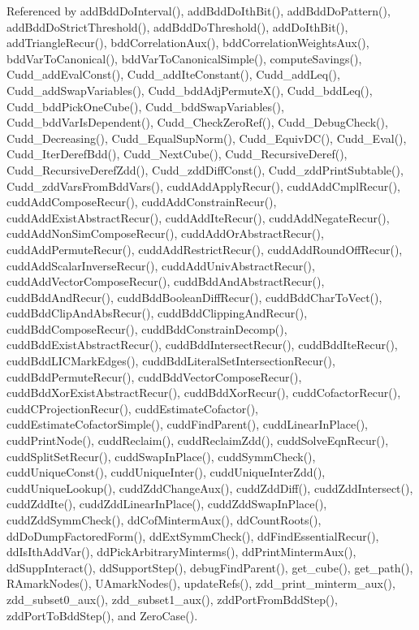 Referenced by add\-Bdd\-Do\-Interval(), add\-Bdd\-Do\-Ith\-Bit(), add\-Bdd\-Do\-Pattern(), add\-Bdd\-Do\-Strict\-Threshold(), add\-Bdd\-Do\-Threshold(), add\-Do\-Ith\-Bit(), add\-Triangle\-Recur(), bdd\-Correlation\-Aux(), bdd\-Correlation\-Weights\-Aux(), bdd\-Var\-To\-Canonical(), bdd\-Var\-To\-Canonical\-Simple(), compute\-Savings(), Cudd\_\-add\-Eval\-Const(), Cudd\_\-add\-Ite\-Constant(), Cudd\_\-add\-Leq(), Cudd\_\-add\-Swap\-Variables(), Cudd\_\-bdd\-Adj\-Permute\-X(), Cudd\_\-bdd\-Leq(), Cudd\_\-bdd\-Pick\-One\-Cube(), Cudd\_\-bdd\-Swap\-Variables(), Cudd\_\-bdd\-Var\-Is\-Dependent(), Cudd\_\-Check\-Zero\-Ref(), Cudd\_\-Debug\-Check(), Cudd\_\-Decreasing(), Cudd\_\-Equal\-Sup\-Norm(), Cudd\_\-Equiv\-DC(), Cudd\_\-Eval(), Cudd\_\-Iter\-Deref\-Bdd(), Cudd\_\-Next\-Cube(), Cudd\_\-Recursive\-Deref(), Cudd\_\-Recursive\-Deref\-Zdd(), Cudd\_\-zdd\-Diff\-Const(), Cudd\_\-zdd\-Print\-Subtable(), Cudd\_\-zdd\-Vars\-From\-Bdd\-Vars(), cudd\-Add\-Apply\-Recur(), cudd\-Add\-Cmpl\-Recur(), cudd\-Add\-Compose\-Recur(), cudd\-Add\-Constrain\-Recur(), cudd\-Add\-Exist\-Abstract\-Recur(), cudd\-Add\-Ite\-Recur(), cudd\-Add\-Negate\-Recur(), cudd\-Add\-Non\-Sim\-Compose\-Recur(), cudd\-Add\-Or\-Abstract\-Recur(), cudd\-Add\-Permute\-Recur(), cudd\-Add\-Restrict\-Recur(), cudd\-Add\-Round\-Off\-Recur(), cudd\-Add\-Scalar\-Inverse\-Recur(), cudd\-Add\-Univ\-Abstract\-Recur(), cudd\-Add\-Vector\-Compose\-Recur(), cudd\-Bdd\-And\-Abstract\-Recur(), cudd\-Bdd\-And\-Recur(), cudd\-Bdd\-Boolean\-Diff\-Recur(), cudd\-Bdd\-Char\-To\-Vect(), cudd\-Bdd\-Clip\-And\-Abs\-Recur(), cudd\-Bdd\-Clipping\-And\-Recur(), cudd\-Bdd\-Compose\-Recur(), cudd\-Bdd\-Constrain\-Decomp(), cudd\-Bdd\-Exist\-Abstract\-Recur(), cudd\-Bdd\-Intersect\-Recur(), cudd\-Bdd\-Ite\-Recur(), cudd\-Bdd\-LICMark\-Edges(), cudd\-Bdd\-Literal\-Set\-Intersection\-Recur(), cudd\-Bdd\-Permute\-Recur(), cudd\-Bdd\-Vector\-Compose\-Recur(), cudd\-Bdd\-Xor\-Exist\-Abstract\-Recur(), cudd\-Bdd\-Xor\-Recur(), cudd\-Cofactor\-Recur(), cudd\-CProjection\-Recur(), cudd\-Estimate\-Cofactor(), cudd\-Estimate\-Cofactor\-Simple(), cudd\-Find\-Parent(), cudd\-Linear\-In\-Place(), cudd\-Print\-Node(), cudd\-Reclaim(), cudd\-Reclaim\-Zdd(), cudd\-Solve\-Eqn\-Recur(), cudd\-Split\-Set\-Recur(), cudd\-Swap\-In\-Place(), cudd\-Symm\-Check(), cudd\-Unique\-Const(), cudd\-Unique\-Inter(), cudd\-Unique\-Inter\-Zdd(), cudd\-Unique\-Lookup(), cudd\-Zdd\-Change\-Aux(), cudd\-Zdd\-Diff(), cudd\-Zdd\-Intersect(), cudd\-Zdd\-Ite(), cudd\-Zdd\-Linear\-In\-Place(), cudd\-Zdd\-Swap\-In\-Place(), cudd\-Zdd\-Symm\-Check(), dd\-Cof\-Minterm\-Aux(), dd\-Count\-Roots(), dd\-Do\-Dump\-Factored\-Form(), dd\-Ext\-Symm\-Check(), dd\-Find\-Essential\-Recur(), dd\-Is\-Ith\-Add\-Var(), dd\-Pick\-Arbitrary\-Minterms(), dd\-Print\-Minterm\-Aux(), dd\-Supp\-Interact(), dd\-Support\-Step(), debug\-Find\-Parent(), get\_\-cube(), get\_\-path(), RAmark\-Nodes(), UAmark\-Nodes(), update\-Refs(), zdd\_\-print\_\-minterm\_\-aux(), zdd\_\-subset0\_\-aux(), zdd\_\-subset1\_\-aux(), zdd\-Port\-From\-Bdd\-Step(), zdd\-Port\-To\-Bdd\-Step(), and Zero\-Case().
